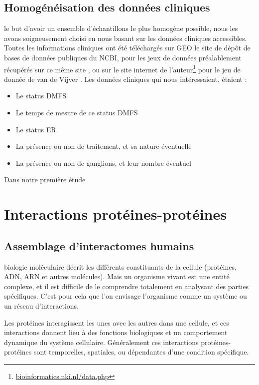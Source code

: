     \subsection{\textcolor{mygreen}{Homogénéisation des données cliniques}}
       le but d'avoir un ensemble d'échantillons le plus homogène possible, nous les avons soigneusement choisi en nous basant sur les données cliniques accessibles.
      Toutes les informations cliniques ont été téléchargés sur \acs{GEO} le site de dépôt de bases de données publiques du \acs{NCBI}, pour les jeux de données préalablement récupérés sur ce même site \citep{Desmedt2008, Loi2008, Sabatier2011, Schmidt2008, Wang2005}, ou sur le site internet de l'auteur\footnote{\url{bioinformatics.nki.nl/data.php}} pour le jeu de donnée de van de Vijver \citep{vandevijver2002}.
      Les données cliniques qui nous intéressaient, étaient :
      \begin{itemize}
        \item Le status \acs{DMFS}
        \item Le temps de mesure de ce status \acs{DMFS}
        \item Le status \acs{ER}
        \item La présence ou non de traitement, et sa nature éventuelle
        \item La présence ou non de ganglions, et leur nombre éventuel
      \end{itemize}

      Dans notre première étude 

  \section{\textcolor{mygreen}{Interactions protéines-protéines}}\label{sec:IPP}

    \subsection{\textcolor{mygreen}{Assemblage d'interactomes humains}}
       biologie moléculaire décrit les différents constituants de la cellule (protéines, \acs{ADN}, \acs{ARN} et autres molécules). Mais un organisme vivant est une entité complexe, et il est difficile de le comprendre totalement en analysant des parties spécifiques. C'est pour cela que l'on envisage l'organisme comme un système ou un réseau d'interactions.

      Les protéines interagissent les unes avec les autres dans une cellule, et ces interactions donnent lieu à des fonctions biologiques et un comportement dynamique du système cellulaire. Généralement ces interactions protéines-protéines sont temporelles, spatiales, ou dépendantes d'une condition spécifique.

